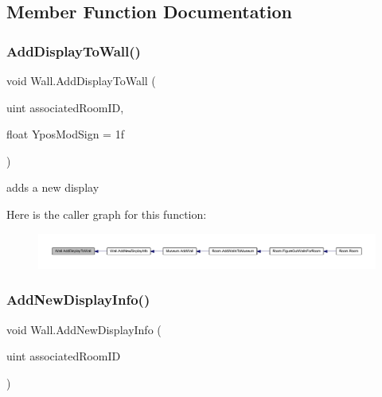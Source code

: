 \subsection{Member Function Documentation}
\mbox{\label{class_wall_a2c2ccc6de461b4979816536859ef591c}} 
\subsubsection{\texorpdfstring{Add\+Display\+To\+Wall()}{AddDisplayToWall()}}
{\footnotesize\ttfamily void Wall.\+Add\+Display\+To\+Wall (\begin{DoxyParamCaption}\item[{uint}]{associated\+Room\+ID,  }\item[{float}]{Ypos\+Mod\+Sign = {\ttfamily 1f} }\end{DoxyParamCaption})\hspace{0.3cm}{\ttfamily [private]}}



adds a new display 

Here is the caller graph for this function\+:
\nopagebreak
\begin{figure}[H]
\begin{center}
\leavevmode
\includegraphics[width=350pt]{class_wall_a2c2ccc6de461b4979816536859ef591c_icgraph}
\end{center}
\end{figure}
\mbox{\label{class_wall_aaed262c3f6b37525136f3278ca2e80cb}} 
\subsubsection{\texorpdfstring{Add\+New\+Display\+Info()}{AddNewDisplayInfo()}}
{\footnotesize\ttfamily void Wall.\+Add\+New\+Display\+Info (\begin{DoxyParamCaption}\item[{uint}]{associated\+Room\+ID }\end{DoxyParamCaption})}



